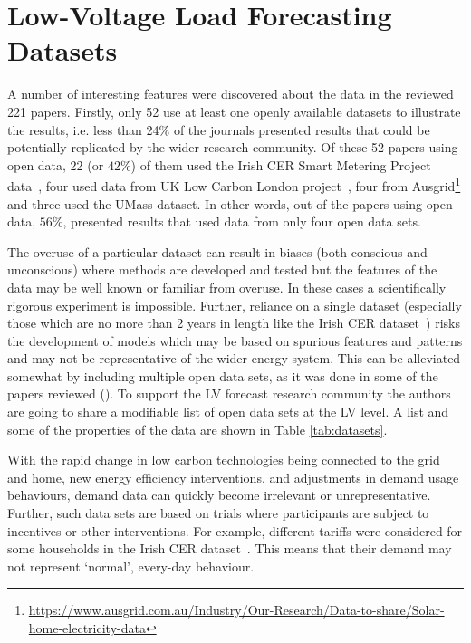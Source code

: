 \section{Low-Voltage Load Forecasting Datasets} 
\label{secdatasets}

A number of interesting features were discovered about the data in the reviewed 221 papers. Firstly, only 52 use at least one openly available datasets to illustrate the results, i.e. less than 24\% of the journals presented results that could be potentially replicated by the wider research community. Of these 52 papers using open data, 22 (or $42\%$)  of them used the Irish CER Smart Metering Project data~\cite{Commission2012csm}, four used data from UK Low Carbon London project~\cite{UK2014ulc}, four from Ausgrid\footnote{\url{https://www.ausgrid.com.au/Industry/Our-Research/Data-to-share/Solar-home-electricity-data}} and three used the UMass dataset. In other words, out of the papers using open data, $56\%$, presented results that used data from only four open data sets. 

The overuse of a particular dataset can result in biases (both conscious and unconscious) where methods are developed and tested but the features of the data may be well known or familiar from overuse. In these cases a scientifically rigorous experiment is impossible. Further, reliance on a single dataset (especially those which are no more than 2 years in length like the Irish CER dataset~\cite{Commission2012csm}) risks the development of models which may be based on spurious features and patterns and may not be representative of the wider energy system. This can be alleviated somewhat by including multiple open data sets, as it was done in some of the papers reviewed (\cite{abera2020mla, Laurinec2019due, Wang2018aef}). To support the LV forecast research community the authors are going to share a modifiable list of open data sets at the LV level. A list and some of the properties of the data are shown in Table \ref{tab:datasets}.  

With the rapid change in low carbon technologies being connected to the grid and home, new energy efficiency interventions, and adjustments in demand usage behaviours, demand data can quickly become irrelevant or unrepresentative. Further, such data sets are based on trials where participants are subject to incentives or other interventions. For example, different tariffs were considered for some households in the Irish CER dataset~\cite{Commission2012csm}. This means that their demand may not represent `normal', every-day behaviour.  

